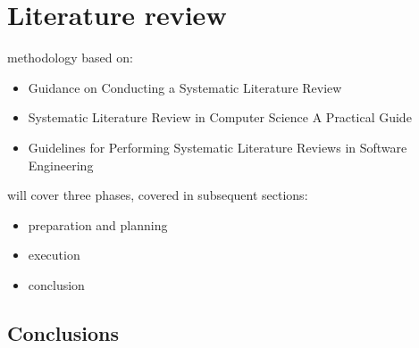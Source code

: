 \section{Literature review}\label{sec:literature-review}

methodology based on:
\begin{itemize}
    \item Guidance on Conducting a Systematic Literature Review~\cite{xiao_guidance_2019}
    \item Systematic Literature Review in Computer Science \textendash A Practical Guide~\cite{neiva_systematic_2016}
    \item Guidelines for Performing Systematic Literature Reviews in Software Engineering~\cite{kitchenham_guidelines_2007}
\end{itemize}

will cover three phases, covered in subsequent sections:
\begin{itemize}
    \item preparation and planning
    \item execution
    \item conclusion
\end{itemize}





\subsection{Conclusions}\label{subsec:conclusions}
